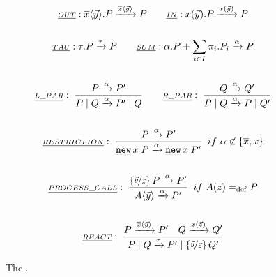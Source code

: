 \begin{figure}[H]
\begin{gather*}
\underline{\scriptstyle{OUT}}: \out{x}{\vec{y}}.P \transs{\out{x}{\vec{y}}} P
\quad\quad
\underline{\scriptstyle{IN}}: \inp{x}{\vec{y}}.P \transs{\inp{x}{\vec{y}}} P
\\\\
\underline{\scriptstyle{TAU}}: \tau.P \transs{\tau} P
\quad\quad
\underline{\scriptstyle{SUM}}: \procchoice{\alpha.P}{\procsum} \transs{\alpha} P
\\\\
\kalRule[]{L\_PAR}{}{P \transs{\alpha} P'}{\procpar{P}{Q} \transs{\alpha} \procpar{P'}{Q}}
\quad\quad
\kalRule[]{R\_PAR}{}{Q \transs{\alpha} Q'}{\procpar{P}{Q} \transs{\alpha} \procpar{P}{Q'}}
\\\\
\kalRule[if\ \alpha \nin \{\overline{x},x\}]{RESTRICTION}{}{P \transs{\alpha} P'}{\procres{x}{P} \transs{\alpha} \procres{x}{P'}}
\\\\
\kalRule[if\ \procdef{A}{\vec{z}}\define{}P]{PROCESS\_CALL}{}{\subs{\vec{y}}{\vec{z}}P \transs{\alpha} P'}{\proccall{A}{\vec{y}} \transs{\alpha} P'}
\\\\
\kalRule[]{REACT}{P \transs{\out{x}{\vec{y}}} P'}{Q \transs{\inp{x}{\vec{z}}} Q'}{\procpar{P}{Q} \transs{\tau} \procpar{P'}{\subs{\vec{y}}{\vec{z}}Q'}}
\end{gather*}
\caption{The  \cite{milner}.}
\label{fig_transition_rules}
\end{figure}

